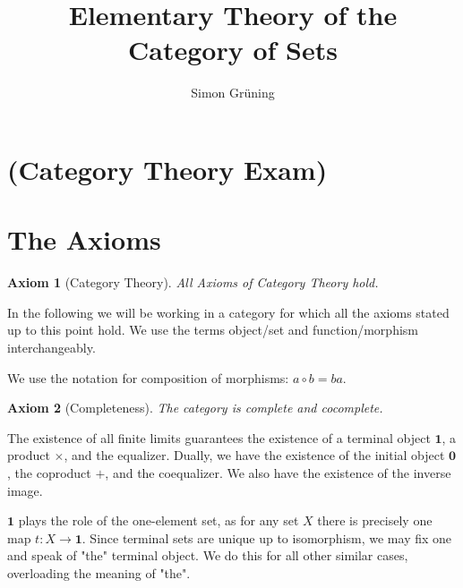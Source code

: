 


\title{Elementary Theory of the Category of Sets}
\author{Simon Gr\"uning}
\address[Simon Gr\"uning]{University of Zurich, R\"{a}mistrasse 71, 8006 Zurich}

\newtheorem{axiom}{Axiom}
\setcounter{axiom}{-1}

\maketitle

\section*{(Category Theory Exam)}


\clearpage




\section{The Axioms}

\begin{axiom}[Category Theory]
All Axioms of Category Theory hold.
\end{axiom}

\begin{remark}
In the following we will be working in a category for which all the axioms stated up to this point hold. We use the terms object/set and function/morphism interchangeably.

We use the notation for composition of morphisms: $a \circ b = ba$.
\end{remark}

\begin{axiom}[Completeness]
The category is complete and cocomplete.
\end{axiom}

\begin{remark}
The existence of all finite limits guarantees the existence of a terminal object $\mathbf{1}$, a product $\times$, and the equalizer. Dually, we have the existence of the initial object $\mathbf{0}$, the coproduct $+$, and the coequalizer. We also have the existence of the inverse image.
\end{remark}

\begin{remark}
$\mathbf{1}$ plays the role of the one-element set, as for any set $X$ there is precisely one map $t: X \longrightarrow \mathbf{1}$. Since terminal sets are unique up to isomorphism, we may fix one and speak of "the" terminal object. We do this for all other similar cases, overloading the meaning of "the".
\end{remark}

